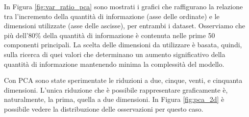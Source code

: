 \documentclass[12pt,italian]{report}
\begin{document}
In Figura \ref{fig:var_ratio_pca} sono mostrati i grafici che raffigurano la relazione tra l'incremento della quantità di informazione (asse delle ordinate) e le dimensioni utilizzate (asse delle ascisse), per entrambi i dataset. %
Osserviamo che più dell'80\% della quantità di informazione è contenuta nelle prime 50 componenti principali.
La scelta delle dimensioni da utilizzare è basata, quindi, sulla ricerca di quei valori che determinano un aumento significativo della quantità di informazione mantenendo minima la complessità del modello.


Con PCA sono state sperimentate le riduzioni a due, cinque, venti, e cinquanta dimensioni. L'unica riduzione che è possibile rappresentare graficamente è, naturalmente, la prima, quella a due dimensioni. In Figura \ref{fig:pca_2d} è possibile vedere la distribuzione delle osservazioni per questo caso.
\end{document}
